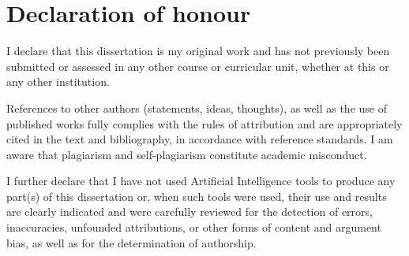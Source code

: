 \chapter*{Declaration of honour}

I declare that this dissertation is my original work and has 
not previously been submitted or assessed in any other course or 
curricular unit, whether at this or any other institution.


References to other authors (statements, ideas, thoughts), as well 
as the use of published works fully complies with the rules of 
attribution and are appropriately cited in the text and bibliography, 
in accordance with reference standards. 
I am aware that plagiarism and self-plagiarism constitute 
academic misconduct.


I further declare that I have not used Artificial Intelligence tools 
to produce any part(s) of this dissertation or, when such tools 
were used, their use and results are clearly indicated and were 
carefully reviewed for the detection of errors, inaccuracies, 
unfounded attributions, or other forms of content and argument bias, 
as well as for the determination of authorship.




